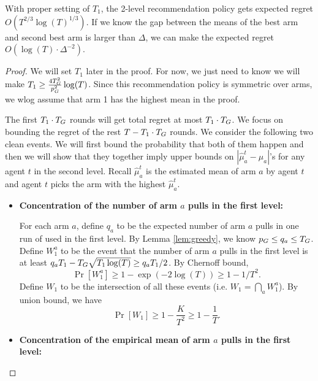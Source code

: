 \begin{theorem}
\label{thm:2level}
With proper setting of $T_1$, the 2-level recommendation policy gets expected regret $O(T^{2/3} \log(T)^{1/3})$. If we know the gap between the means of the best arm and second best arm is larger than $\Delta$, we can make the expected regret $O(\log(T) \cdot \Delta^{-2})$. 
\end{theorem}

\begin{proof}
We will set $T_1$ later in the proof. For now, we just need to know we will make $T_1 \geq \frac{4T_G^2}{p_G^2}\log(T)$. Since this recommendation policy is symmetric over arms, we wlog assume that arm 1 has the highest mean in the proof.

The first $T_1 \cdot T_G$ rounds will get total regret at most $T_1 \cdot T_G$.  We focus on bounding the regret of the rest $T - T_1 \cdot T_G$ rounds. We consider the following two clean events. We will first bound the probability that both of them happen and then we will show that they together imply upper bounds on $|\hat{\mu}^t_a - \mu_a|$'s for any agent $t$ in the second level. Recall $\hat{\mu}^t_a$ is the estimated mean of arm $a$ by agent $t$ and agent $t$ picks the arm with the highest $\hat{\mu}^t_a$.

\begin{itemize}
\item \textbf{Concentration of the number of arm $a$ pulls in the first level:} 

  For each arm $a$, define $q_a$ to be the expected number of arm $a$
  pulls in one run of \ALGG used in the first level. 
    By Lemma
  \ref{lem:greedy}, we know $p_G \leq q_a \leq
  T_G$.
   Define $W_1^a$ to be the event that the
  number of arm $a$ pulls in the first level is at least
  $q_a T_1- T_G \sqrt{T_1\log(T)} \geq q_a T_1 / 2$. 
    By Chernoff
  bound,
\[
\Pr[W_1^a] \geq 1-\exp(-2\log(T)) \geq 1-1/T^2.
\]
Define $W_1$ to be the intersection of all these events (i.e. $W_1 = \bigcap_{a}W_1^a$). By union bound, we have
\[
\Pr[W_1] \geq 1- \frac{K}{T^2} \geq 1 - \frac{1}{T}.
\]
\item  \textbf{Concentration of the empirical mean of arm $a$ pulls in the first level:}


\end{itemize}
\end{proof}
